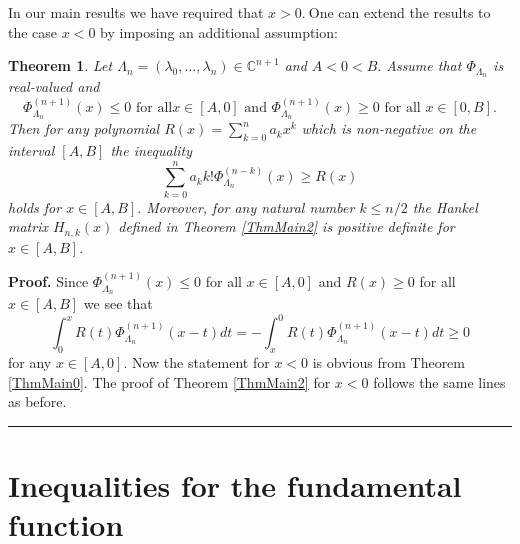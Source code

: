 \documentclass[11pt]{article}%
\newtheorem{theorem}{Theorem}
\newenvironment{proof}[1][Proof]{\textbf{#1.} }{\ \rule{0.5em}{0.5em}}
\begin{document}
In our main results we have required that $x>0.\ $One can extend the results
to the case $x<0$ by imposing an additional assumption:

\begin{theorem}
\label{ThmMain12plus} Let $\Lambda_{n}=\left(  \lambda_{0},\ldots,\lambda
_{n}\right)  \in\mathbb{C}^{n+1}$ and $A<0<B.$ Assume that $\Phi_{\Lambda_{n}%
}$ is real-valued and
\[
\Phi_{\Lambda_{n}}^{\left(  n+1\right)  }\left(  x\right)  \leq0\text{ for all
}x\in\left[  A,0\right]  \text{ and }\Phi_{\Lambda_{n}}^{\left(  n+1\right)
}\left(  x\right)  \geq0\text{ for all }x\in\left[  0,B\right]  .
\]
Then for any polynomial $R\left(  x\right)  =%
{\displaystyle\sum_{k=0}^{n}}
a_{k}x^{k}$ which is non-negative on the interval $\left[  A,B\right]  $ the
inequality
\[%
{\displaystyle\sum_{k=0}^{n}}
a_{k}k!\Phi_{\Lambda_{n}}^{\left(  n-k\right)  }\left(  x\right)  \geq
R\left(  x\right)
\]
holds for $x\in\left[  A,B\right]  .$ Moreover, for any natural number $k\leq
n/2$ the Hankel matrix $H_{n,k}\left(  x\right)  $ defined in Theorem
\ref{ThmMain2} is positive definite for $x\in\left[  A,B\right]  .$
\end{theorem}

\begin{proof}
Since $\Phi_{\Lambda_{n}}^{\left(  n+1\right)  }\left(  x\right)  \leq0$ for
all $x\in\left[  A,0\right]  $ and $R\left(  x\right)  \geq0$ for all
$x\in\left[  A,B\right]  $ we see that
\[
\int_{0}^{x}R\left(  t\right)  \Phi_{\Lambda_{n}}^{\left(  n+1\right)
}\left(  x-t\right)  dt=-\int_{x}^{0}R\left(  t\right)  \Phi_{\Lambda_{n}%
}^{\left(  n+1\right)  }\left(  x-t\right)  dt\geq0
\]
for any $x\in\left[  A,0\right]  .$ Now the statement for $x<0$ is obvious
from Theorem \ref{ThmMain0}. The proof of Theorem \ref{ThmMain2} for $x<0$
follows the same lines as before.
\end{proof}

\section{Inequalities for the fundamental function}
\end{document}
